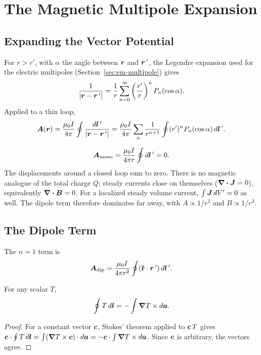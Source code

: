 \section{The Magnetic Multipole Expansion}
\label{sec:em-mag-multipole}

\subsection{Expanding the Vector Potential}

For $r>r'$, with $\alpha$ the angle between $\bm{r}$ and $\bm{r}\,'$, the Legendre expansion used for the electric multipoles (Section~\ref{sec:em-multipole}) gives
\[
    \frac{1}{|\bm{r}-\bm{r}\,'|} = \frac1r\sum_{n=0}^\infty\left(\frac{r'}{r}\right)^nP_n(\cos\alpha).
\]
Applied to a thin loop,
\[
    \vect{A}(\lvect{r}) = \frac{\mu_0I}{4\pi}\oint\frac{d\lvect{l}\,'}{|\lvect{r}-\lvect{r}\,'|}
    = \frac{\mu_0I}{4\pi}\sum_n\frac{1}{r^{n+1}}\oint(r')^nP_n(\cos\alpha)\,d\lvect{l}\,'.
\]

\begin{fact}
\[
    \vect{A}_{\text{mono}} = \frac{\mu_0I}{4\pi r}\oint d\lvect{l}\,' = 0 .
\]
The displacements around a closed loop sum to zero. There is no magnetic analogue of the total charge $Q$: steady currents close on themselves ($\div\vect{J} = 0$), equivalently $\div\vect{B} = 0$. For a localized steady volume current, $\int\vect{J}\,dV' = 0$ as well. The dipole term therefore dominates far away, with $A\propto1/r^2$ and $B\propto1/r^3$.
\end{fact}

\subsection{The Dipole Term}

The $n = 1$ term is
\[
    \vect{A}_{\text{dip}} = \frac{\mu_0I}{4\pi r^2}\oint(\rhat\cdot\lvect{r}\,')\,d\lvect{l}\,'.
\]

\begin{theorem}
For any scalar $T$,
\[
    \oint T\,d\bm{l} = -\int\grad T\times d\bm{a}.
\]
\end{theorem}
\begin{proof}
For a constant vector $\bm{c}$, Stokes' theorem applied to $\bm{c}\,T$ gives $\bm{c}\cdot\oint T\,d\bm{l} = \int(\grad T\times\bm{c})\cdot d\bm{a} = -\bm{c}\cdot\int\grad T\times d\bm{a}$. Since $\bm{c}$ is arbitrary, the vectors agree.
\end{proof}

